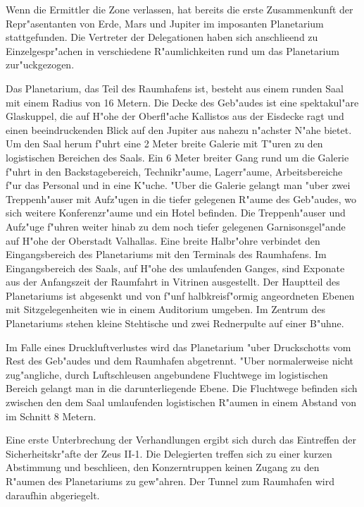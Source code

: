 
Wenn die Ermittler die Zone verlassen, hat bereits die erste Zusammenkunft der Repr"asentanten von Erde, Mars und Jupiter im imposanten Planetarium stattgefunden. Die Vertreter der Delegationen haben sich anschlie\3end zu Einzelgespr"achen in verschiedene R"aumlichkeiten rund um das Planetarium zur"uckgezogen.

Das Planetarium, das Teil des Raumhafens ist, besteht aus einem runden Saal mit einem Radius von 16 Metern. Die Decke des Geb"audes ist eine spektakul"are Glaskuppel, die auf H"ohe der Oberfl"ache Kallistos aus der Eisdecke ragt und einen beeindruckenden Blick auf den Jupiter aus nahezu n"achster N"ahe bietet. Um den Saal herum f"uhrt eine 2 Meter breite Galerie mit T"uren zu den logistischen Bereichen des Saals. Ein 6 Meter breiter Gang rund um die Galerie f"uhrt in den Backstagebereich, Technikr"aume, Lagerr"aume, Arbeitsbereiche f"ur das Personal und in eine K"uche. "Uber die Galerie gelangt man "uber zwei Treppenh"auser mit Aufz"ugen in die tiefer gelegenen R"aume des Geb"audes, wo sich weitere Konferenzr"aume und ein Hotel befinden. Die Treppenh"auser und Aufz"uge f"uhren weiter hinab zu dem noch tiefer gelegenen Garnisonsgel"ande auf H"ohe der Oberstadt Valhallas. Eine breite Halbr"ohre verbindet den Eingangsbereich des Planetariums mit den Terminals des Raumhafens. Im Eingangsbereich des Saals, auf H"ohe des umlaufenden Ganges, sind Exponate aus der Anfangszeit der Raumfahrt in Vitrinen ausgestellt. Der Hauptteil des Planetariums ist abgesenkt und von f"unf halbkreisf"ormig angeordneten Ebenen mit Sitzgelegenheiten wie in einem Auditorium umgeben. Im Zentrum des Planetariums stehen kleine Stehtische und zwei Rednerpulte auf einer B"uhne.

Im Falle eines Druckluftverlustes wird das Planetarium "uber Druckschotts vom Rest des Geb"audes und dem Raumhafen abgetrennt. "Uber normalerweise nicht zug"angliche, durch Luftschleusen angebundene Fluchtwege im logistischen Bereich gelangt man in die darunterliegende Ebene. Die Fluchtwege befinden sich zwischen den dem Saal umlaufenden logistischen R"aumen in einem Abstand von im Schnitt 8 Metern.


Eine erste Unterbrechung der Verhandlungen ergibt sich durch das Eintreffen der Sicherheitskr"afte der Zeus II-1. Die Delegierten treffen sich zu einer kurzen Abstimmung und beschlie\3en, den Konzerntruppen keinen Zugang zu den R"aumen des Planetariums zu gew"ahren. Der Tunnel zum Raumhafen wird daraufhin abgeriegelt.

